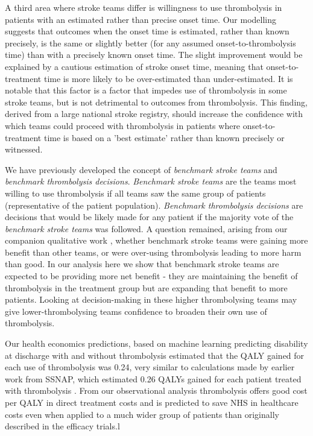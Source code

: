 A third area where stroke teams differ is willingness to use thrombolysis in patients with an estimated rather than precise onset time. Our modelling suggests that outcomes when the onset time is estimated, rather than known precisely, is the same or slightly better (for any assumed onset-to-thrombolysis time) than with a precisely known onset time. The slight improvement would be explained by a cautious estimation of stroke onset time, meaning that onset-to-treatment time is more likely to be over-estimated than under-estimated. It is notable that this factor is a factor that impedes use of thrombolysis in some stroke teams, but is not detrimental to outcomes from thrombolysis. This finding, derived from a large national stroke registry, should increase the confidence with which teams could proceed with thrombolysis in patients where onset-to-treatment time is based on a 'best estimate' rather than known precisely or witnessed.

We have previously developed the concept of \textit{benchmark stroke teams} and \textit{benchmark thrombolysis decisions}. \textit{Benchmark stroke teams} are the teams most willing to use thrombolysis if all teams saw the same group of patients (representative of the patient population). \textit{Benchmark thrombolysis decisions} are decisions that would be likely made for any patient if the majority vote of the \textit{benchmark stroke teams} was followed. A question remained, arising from our companion qualitative work \cite{jarvie_stroke_2024}, whether benchmark stroke teams were gaining more benefit than other teams, or were over-using thrombolysis leading to more harm than good. In our analysis here we show that benchmark stroke teams are expected to be providing more net benefit - they are maintaining the benefit of thrombolysis in the treatment group but are expanding that benefit to more patients. Looking at decision-making in these higher thrombolysing teams may give lower-thrombolysing teams confidence to broaden their own use of thrombolysis.

Our health economics predictions, based on machine learning predicting disability at discharge with and without thrombolysis estimated that the QALY gained for each use of thrombolysis was 0.24, very similar to calculations made by earlier work from SSNAP, which estimated 0.26 QALYs gained for each patient treated with thrombolysis \cite{sentinel_stroke_national_audit_programme_cost_2016}. From our observational analysis thrombolysis offers good cost per QALY in direct treatment costs and is predicted to save NHS in healthcare costs even when applied to a much wider group of patients than originally described in the efficacy trials.l

